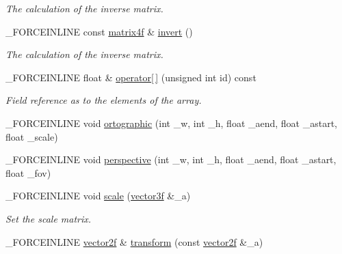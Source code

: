 \begin{DoxyCompactItemize}
\begin{DoxyCompactList}\small\item\em The calculation of the inverse matrix. \end{DoxyCompactList}\item 
\hypertarget{classbt_1_1matrix4f_a756b0ede670e07ad68e013509999bf71}{\-\_\-\-F\-O\-R\-C\-E\-I\-N\-L\-I\-N\-E const \hyperlink{classbt_1_1matrix4f}{matrix4f} \& \hyperlink{classbt_1_1matrix4f_a756b0ede670e07ad68e013509999bf71}{invert} ()}\label{classbt_1_1matrix4f_a756b0ede670e07ad68e013509999bf71}

\begin{DoxyCompactList}\small\item\em The calculation of the inverse matrix. \end{DoxyCompactList}\item 
\hypertarget{classbt_1_1matrix4f_abfca0b249d0852135723a74575206e5a}{\-\_\-\-F\-O\-R\-C\-E\-I\-N\-L\-I\-N\-E float \& \hyperlink{classbt_1_1matrix4f_abfca0b249d0852135723a74575206e5a}{operator\mbox{[}$\,$\mbox{]}} (unsigned int id) const }\label{classbt_1_1matrix4f_abfca0b249d0852135723a74575206e5a}

\begin{DoxyCompactList}\small\item\em Field reference as to the elements of the array. \end{DoxyCompactList}\item 
\-\_\-\-F\-O\-R\-C\-E\-I\-N\-L\-I\-N\-E void \hyperlink{classbt_1_1matrix4f_ad620c2c113baa0383eb49149a590785b}{ortographic} (int \-\_\-w, int \-\_\-h, float \-\_\-aend, float \-\_\-astart, float \-\_\-scale)
\item 
\-\_\-\-F\-O\-R\-C\-E\-I\-N\-L\-I\-N\-E void \hyperlink{classbt_1_1matrix4f_ae63dade5f2d11291a0bc87f4ab00283b}{perspective} (int \-\_\-w, int \-\_\-h, float \-\_\-aend, float \-\_\-astart, float \-\_\-fov)
\item 
\hypertarget{classbt_1_1matrix4f_a6ee16f3076e659e624e1cc8a19dc1fcd}{\-\_\-\-F\-O\-R\-C\-E\-I\-N\-L\-I\-N\-E void \hyperlink{classbt_1_1matrix4f_a6ee16f3076e659e624e1cc8a19dc1fcd}{scale} (\hyperlink{classbt_1_1vector3f}{vector3f} \&\-\_\-a)}\label{classbt_1_1matrix4f_a6ee16f3076e659e624e1cc8a19dc1fcd}

\begin{DoxyCompactList}\small\item\em Set the scale matrix. \end{DoxyCompactList}\item 
\hypertarget{classbt_1_1matrix4f_a90e1ce609a80a64193bc21a6aa70c6ec}{\-\_\-\-F\-O\-R\-C\-E\-I\-N\-L\-I\-N\-E \hyperlink{classbt_1_1vector2f}{vector2f} \& \hyperlink{classbt_1_1matrix4f_a90e1ce609a80a64193bc21a6aa70c6ec}{transform} (const \hyperlink{classbt_1_1vector2f}{vector2f} \&\-\_\-a)}\label{classbt_1_1matrix4f_a90e1ce609a80a64193bc21a6aa70c6ec}


\end{DoxyCompactItemize}
